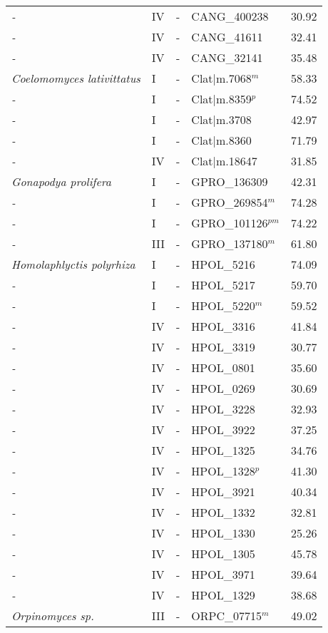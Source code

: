 {{\begin{longtable}{llllr}
  \emph{-} & IV & - & CANG\_400238 & 30.92 \\ 
  \emph{-} & IV & - & CANG\_41611 & 32.41 \\ 
  \emph{-} & IV & - & CANG\_32141 & 35.48 \\ 
  \emph{Coelomomyces lativittatus} & I & - & Clat|m.7068$^{m}$ & 58.33 \\ 
  \emph{-} & I & - & Clat|m.8359$^{p}$ & 74.52 \\ 
  \emph{-} & I & - & Clat|m.3708 & 42.97 \\ 
  \emph{-} & I & - & Clat|m.8360 & 71.79 \\ 
  \emph{-} & IV & - & Clat|m.18647 & 31.85 \\ 
  \emph{Gonapodya prolifera } & I & - & GPRO\_136309 & 42.31 \\ 
  \emph{-} & I & - & GPRO\_269854$^{m}$ & 74.28 \\ 
  \emph{-} & I & - & GPRO\_101126$^{pm}$ & 74.22 \\ 
  \emph{-} & III & - & GPRO\_137180$^{m}$ & 61.80 \\ 
  \emph{Homolaphlyctis polyrhiza} & I & - & HPOL\_5216 & 74.09 \\ 
  \emph{-} & I & - & HPOL\_5217 & 59.70 \\ 
  \emph{-} & I & - & HPOL\_5220$^{m}$ & 59.52 \\ 
  \emph{-} & IV & - & HPOL\_3316 & 41.84 \\ 
  \emph{-} & IV & - & HPOL\_3319 & 30.77 \\ 
  \emph{-} & IV & - & HPOL\_0801 & 35.60 \\ 
  \emph{-} & IV & - & HPOL\_0269 & 30.69 \\ 
  \emph{-} & IV & - & HPOL\_3228 & 32.93 \\ 
  \emph{-} & IV & - & HPOL\_3922 & 37.25 \\ 
  \emph{-} & IV & - & HPOL\_1325 & 34.76 \\ 
  \emph{-} & IV & - & HPOL\_1328$^{p}$ & 41.30 \\ 
  \emph{-} & IV & - & HPOL\_3921 & 40.34 \\ 
  \emph{-} & IV & - & HPOL\_1332 & 32.81 \\ 
  \emph{-} & IV & - & HPOL\_1330 & 25.26 \\ 
  \emph{-} & IV & - & HPOL\_1305 & 45.78 \\ 
  \emph{-} & IV & - & HPOL\_3971 & 39.64 \\ 
  \emph{-} & IV & - & HPOL\_1329 & 38.68 \\ 
  \emph{Orpinomyces sp.} & III & - & ORPC\_07715$^{m}$ & 49.02 \\ 

\end{longtable}}}
